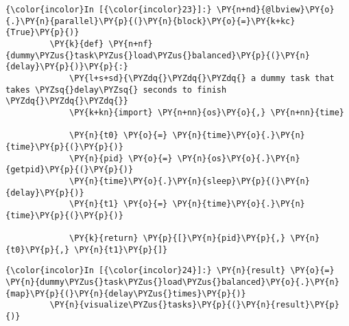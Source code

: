    \begin{Verbatim}[commandchars=\\\{\}]
{\color{incolor}In [{\color{incolor}23}]:} \PY{n+nd}{@lbview}\PY{o}{.}\PY{n}{parallel}\PY{p}{(}\PY{n}{block}\PY{o}{=}\PY{k+kc}{True}\PY{p}{)}
         \PY{k}{def} \PY{n+nf}{dummy\PYZus{}task\PYZus{}load\PYZus{}balanced}\PY{p}{(}\PY{n}{delay}\PY{p}{)}\PY{p}{:}
             \PY{l+s+sd}{\PYZdq{}\PYZdq{}\PYZdq{} a dummy task that takes \PYZsq{}delay\PYZsq{} seconds to finish \PYZdq{}\PYZdq{}\PYZdq{}}
             \PY{k+kn}{import} \PY{n+nn}{os}\PY{o}{,} \PY{n+nn}{time}
         
             \PY{n}{t0} \PY{o}{=} \PY{n}{time}\PY{o}{.}\PY{n}{time}\PY{p}{(}\PY{p}{)}
             \PY{n}{pid} \PY{o}{=} \PY{n}{os}\PY{o}{.}\PY{n}{getpid}\PY{p}{(}\PY{p}{)}
             \PY{n}{time}\PY{o}{.}\PY{n}{sleep}\PY{p}{(}\PY{n}{delay}\PY{p}{)}
             \PY{n}{t1} \PY{o}{=} \PY{n}{time}\PY{o}{.}\PY{n}{time}\PY{p}{(}\PY{p}{)}
             
             \PY{k}{return} \PY{p}{[}\PY{n}{pid}\PY{p}{,} \PY{n}{t0}\PY{p}{,} \PY{n}{t1}\PY{p}{]}
\end{Verbatim}

    \begin{Verbatim}[commandchars=\\\{\}]
{\color{incolor}In [{\color{incolor}24}]:} \PY{n}{result} \PY{o}{=} \PY{n}{dummy\PYZus{}task\PYZus{}load\PYZus{}balanced}\PY{o}{.}\PY{n}{map}\PY{p}{(}\PY{n}{delay\PYZus{}times}\PY{p}{)}
         \PY{n}{visualize\PYZus{}tasks}\PY{p}{(}\PY{n}{result}\PY{p}{)}
\end{Verbatim}
\begin{center}
    \end{center}
    { \hspace*{\fill} \\}












